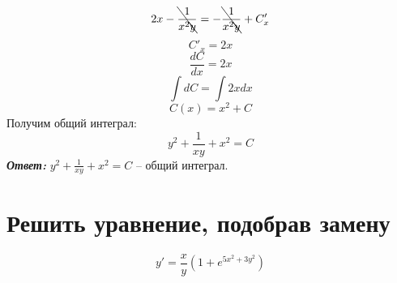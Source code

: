 \documentclass[a5paper, 10pt]{article}
\theoremstyle{definition}
\theoremstyle{plain}
\theoremstyle{remark}
\begin{document}
\begin{equation*}
2x - \bcancel{\frac{1}{x^2y}}  =   -\bcancel{\frac{1}{x^2y}} + C'_x
\end{equation*}
\begin{equation*}
 C'_x = 2x
\end{equation*}
\begin{equation*}
\frac{dC}{dx} = 2x
\end{equation*}
\begin{equation*}
\int dC= \int 2x dx
\end{equation*}
\begin{equation*}
C(x) = x^2 + C
\end{equation*}
Получим общий интеграл:
\begin{equation*}
y^2 + \frac{1}{xy} + x^2 =  C
\end{equation*}
\textit{\textbf{Ответ:}} $ y^2 + \frac{1}{xy} + x^2 =  C$ -- общий интеграл.

\section{Решить уравнение, подобрав замену}
\begin{equation*}
y' = \frac{x}{y} \left( 1 + e^{5x^2+3y^2} \right)
\end{equation*}
\end{document}
